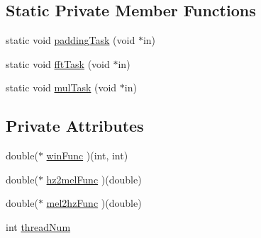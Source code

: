 \subsection*{Static Private Member Functions}
\begin{DoxyCompactItemize}
\item 
static void \hyperlink{class_feature_extractor_a05a98a7117a0216eb39d380553977f4a}{padding\+Task} (void $\ast$in)
\item 
static void \hyperlink{class_feature_extractor_a42b493ca708ec577e99d58125c108143}{fft\+Task} (void $\ast$in)
\item 
static void \hyperlink{class_feature_extractor_a5c5f3e36708bdc49da0ac30e4beee165}{mul\+Task} (void $\ast$in)
\end{DoxyCompactItemize}
\subsection*{Private Attributes}
\begin{DoxyCompactItemize}
\item 
double($\ast$ \hyperlink{class_feature_extractor_a573d66a2731f098e798ac6c0bc683ec2}{win\+Func} )(int, int)
\item 
double($\ast$ \hyperlink{class_feature_extractor_a5158d47cdf3ff7cfc48bde9c4169dfd2}{hz2mel\+Func} )(double)
\item 
double($\ast$ \hyperlink{class_feature_extractor_a7b69346e500a23a96be63ebf891a069e}{mel2hz\+Func} )(double)
\item 
int \hyperlink{class_feature_extractor_a1c4293f263166c151706379d01f561f0}{thread\+Num}
\end{DoxyCompactItemize}


